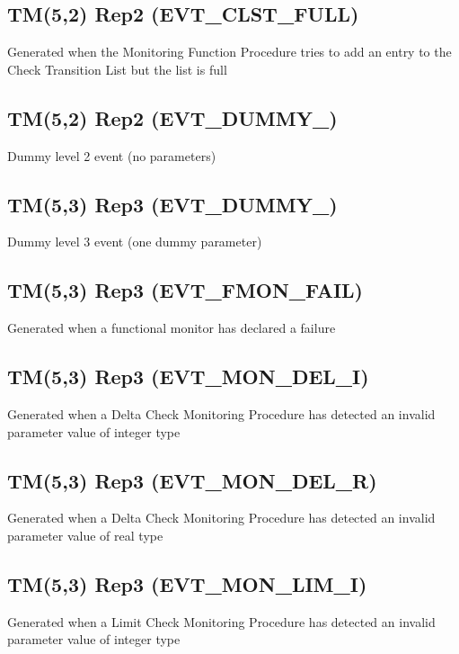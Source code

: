 \pagebreak
\subsection{TM(5,2) Rep2 (EVT\_\-CLST\_\-FULL)}
Generated when the Monitoring Function Procedure tries to add an entry to the Check Transition List but the list is full

\pagebreak
\subsection{TM(5,2) Rep2 (EVT\_\-DUMMY\_)}
Dummy level 2 event (no parameters)

\pagebreak
\subsection{TM(5,3) Rep3 (EVT\_\-DUMMY\_)}
Dummy level 3 event (one dummy parameter)

\pagebreak
\subsection{TM(5,3) Rep3 (EVT\_\-FMON\_\-FAIL)}
Generated when a functional monitor has declared a failure

\pagebreak
\subsection{TM(5,3) Rep3 (EVT\_\-MON\_\-DEL\_\-I)}
Generated when a Delta Check Monitoring Procedure has detected an invalid parameter value of integer type

\pagebreak
\subsection{TM(5,3) Rep3 (EVT\_\-MON\_\-DEL\_\-R)}
Generated when a Delta Check Monitoring Procedure has detected an invalid parameter value of real type

\pagebreak
\subsection{TM(5,3) Rep3 (EVT\_\-MON\_\-LIM\_\-I)}
Generated when a Limit Check Monitoring Procedure has detected an invalid parameter value of integer type


